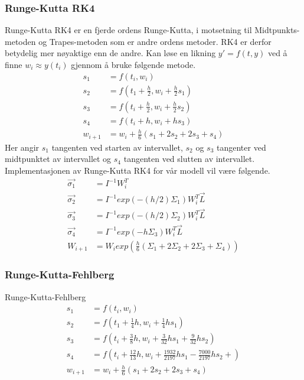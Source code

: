 \subsubsection{Runge-Kutta RK4}
Runge-Kutta RK4 er en fjerde ordens Runge-Kutta, i motsetning til Midtpunkts-metoden og Trapes-metoden som er andre ordens metoder. RK4 er derfor betydelig mer nøyaktige enn de andre. \newline\newline
Kan løse en likning $y' = f(t, y)$ ved å finne $w_i \approx y(t_i)$ gjennom å bruke følgende metode. 
\begin{equation}
\begin{aligned}
    s_1&=f(t_i, w_i)\\
    s_2&=f(t_1+\frac{h}{2}, w_i + \frac{h}{2}s_1)\\
    s_3&=f(t_i+\frac{h}{2}, w_i+\frac{h}{2}s_2)\\
    s_4&=f(t_i+h, w_i+hs_3)\\
    w_{i+1}&=w_i+\frac{h}{6}(s_1+2s_2+2s_3+s_4)
\end{aligned}
\end{equation}
Her angir $s_1$ tangenten ved starten av intervallet, $s_2$ og $s_3$ tangenter ved midtpunktet av intervallet og $s_4$ tangenten ved slutten av intervallet.\newline\newline
Implementasjonen av Runge-Kutta RK4 for vår modell vil være følgende.
\begin{equation}
\begin{aligned}
    \Vec{\sigma_1}&=I^{-1}W^T_i\\
    \Vec{\sigma_2}&=I^{-1}exp(-(h/2)\Sigma_1)W^T_i\Vec{L}\\
    \Vec{\sigma_3}&=I^{-1}exp(-(h/2)\Sigma_2)W^T_i\Vec{L}\\
    \Vec{\sigma_4}&=I^{-1}exp(-h\Sigma_3)W^T_i\Vec{L}\\
    W_{i+1}&=W_iexp(\frac{h}{6}(\Sigma_1+2\Sigma_2+2\Sigma_3+\Sigma_4))
\end{aligned}
\end{equation}

\subsubsection{Runge-Kutta-Fehlberg}
Runge-Kutta-Fehlberg 
\begin{equation}
\begin{aligned}
    s_1&=f(t_i, w_i)\\
    s_2&=f(t_1+\frac{1}{4}h, w_i + \frac{1}{4}hs_1)\\
    s_3&=f(t_i+\frac{3}{8}h, w_i+\frac{3}{32}hs_1+\frac{9}{32}hs_2)\\
    s_4&=f(t_i+\frac{12}{13}h, w_i+\frac{1932}{2197}hs_1-\frac{7000}{2197}hs_2+)\\
    w_{i+1}&=w_i+\frac{h}{6}(s_1+2s_2+2s_3+s_4)
\end{aligned}
\end{equation}